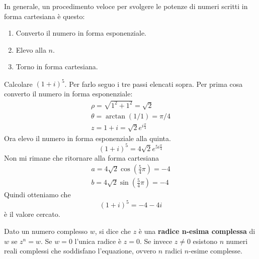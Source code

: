 In generale, un procedimento veloce per svolgere le potenze di numeri scritti in forma
cartesiana \`e questo:
\begin{enumerate}
	\item Converto il numero in forma esponenziale.
	\item Elevo alla $n$.
	\item Torno in forma cartesiana.
\end{enumerate}

\begin{example}
	Calcolare $(1 + i)^5$.
	Per farlo seguo i tre passi elencati sopra. Per prima cosa converto il numero in forma
	esponenziale:
	\begin{gather*}
		\rho = \sqrt{1^2 + 1^2} = \sqrt{2}  \\
		\theta = \arctan{(1 / 1)} = \pi / 4 \\
		z = 1 + i = \sqrt{2} e^{i \frac{\pi}{4}}
	\end{gather*}
	Ora elevo il numero in forma esponenziale alla quinta.
	\begin{equation*}
		(1 + i)^5 = 4 \sqrt{2} e^{5 i \frac{\pi}{4}}
	\end{equation*}
	Non mi rimane che ritornare alla forma cartesiana
	\begin{gather*}
		a = 4 \sqrt{2} \cos{\left( \frac{5}{4} \pi \right)} = -4 \\
		b = 4 \sqrt{2} \sin{\left( \frac{5}{4} \pi \right)} = -4
	\end{gather*}
	Quindi otteniamo che
	\begin{equation*}
		(1 + i)^5 = -4 - 4i
	\end{equation*}
	\`e il valore cercato.
\end{example}

\begin{definition}
	Dato un numero complesso $w$, si dice che $z$ \`e una \textbf{radice n-esima complessa} di $w$
	se $z^n = w$.
	Se $w = 0$ l'unica radice \`e $z = 0$. Se invece $z \neq 0$ esistono $n$ numeri reali complessi
	che soddisfano l'equazione, ovvero $n$ radici $n$-esime complesse.
\end{definition}

